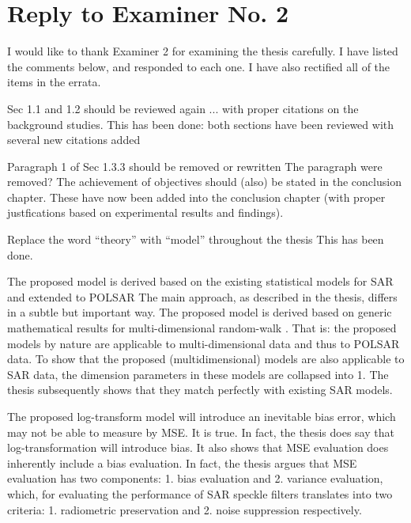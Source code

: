 \section*{Reply to Examiner No. 2}

\begin{replyheader}
\end{replyheader}  

I would like to thank Examiner 2 for examining the thesis carefully. I have listed the comments below, and responded to each one. I have also rectified all of the items in the errata.

\replyToComment
    {Sec 1.1 and 1.2 should be reviewed again ... with proper citations on the background studies.}
    {This has been done: both sections have been reviewed with several new citations added}

\replyToComment
    {Paragraph 1 of Sec 1.3.3 should be removed or rewritten}
    {The paragraph were removed?}
\replyToComment
    {The achievement of objectives should (also) be stated in the conclusion chapter. }
    {These have now been added into the conclusion chapter (with proper justfications based on experimental results and findings).}

\replyToComment
    {Replace the word ``theory'' with ``model'' throughout the thesis}
    {This has been done.}
    
\replyToComment
    {The proposed model is derived based on the existing statistical models for SAR and extended to POLSAR}
    {The main approach, as described in the thesis, differs in a subtle but important way.
The proposed model is derived based on generic mathematical results for multi-dimensional random-walk \cite{Goodman_JOptSocAm_76, Goodman_Springer_1975}.
That is: the proposed models by nature are applicable to multi-dimensional data and thus to POLSAR data.
To show that the proposed (multidimensional) models are also applicable to SAR data, the dimension parameters in these models are collapsed into 1. The thesis subsequently shows that they match perfectly with existing SAR models.
}

\replyToComment
    {The proposed log-transform model will introduce an inevitable bias error, which may not be able to measure by MSE.}
    {
      It is true. In fact, the thesis does say that log-transformation will introduce bias. %
      It also shows that MSE evaluation does inherently include a bias evaluation.
      In fact, the thesis argues that MSE evaluation has two components: 1. bias evaluation and 2. variance evaluation, which, for evaluating the performance of SAR speckle filters translates into two criteria: 1. radiometric preservation and 2. noise suppression respectively.
}

